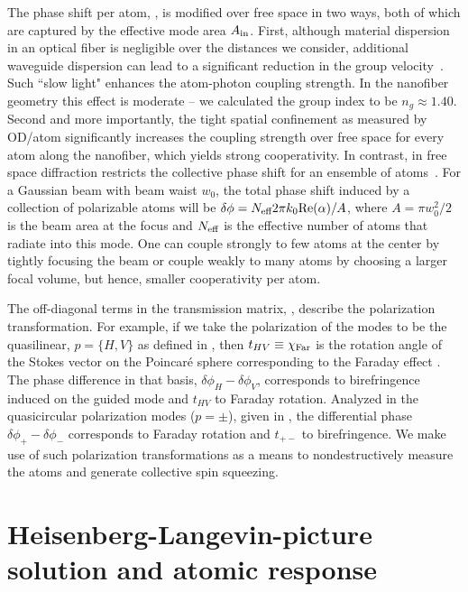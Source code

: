 \documentclass[aps,pra,twocolumn]{revtex4-1} %
\begin{document}
The phase shift per atom, , is modified over free space in two ways, both of which are captured by the effective mode area $A_{\rm in}$. First, although material dispersion in an optical fiber is negligible over the distances we consider, additional waveguide dispersion can lead to a significant reduction in the group velocity~\cite{hung_trapped_2013,goban_atomlight_2014}.  Such ``slow light" enhances the atom-photon coupling strength. 
In the nanofiber geometry this effect is moderate -- we calculated the group index to be $n_g \approx 1.40$. 
Second and more importantly, the tight spatial confinement as measured by OD/atom significantly increases the coupling strength over free space for every atom along the nanofiber, which yields strong cooperativity.
In contrast, in free space diffraction restricts the collective phase shift for an ensemble of atoms~\cite{tanji-suzuki_chapter_2011, baragiola_three-dimensional_2014}.  
For a Gaussian beam with beam waist $w_0$, the total phase shift induced by a collection of polarizable atoms will be $\delta \phi = N_{\text{eff}} 2 \pi k_0 {\rm Re}({\alpha})/A$, where $A = \pi w^2_0/2$ is the beam area at the focus and $N_{\text{eff}}$ is the effective number of atoms that radiate into this mode.  
One can couple strongly to few atoms at the center by tightly focusing the beam or couple weakly to many atoms by choosing a larger focal volume, but hence, smaller cooperativity per atom.  

The off-diagonal terms in the transmission matrix, , describe the polarization transformation. For example, if we take the polarization of the modes to be the quasilinear, $p = \{H,V\}$ as defined in , then $t_{HV} \equiv \chi_{\rm Far}$ is the rotation angle of the Stokes vector on the Poincar\'{e} sphere corresponding to the Faraday effect \cite{hammerer_quantum_2010, deutsch_quantum_2010}.  
The phase difference in that basis, $\delta  \phi_H - \delta \phi_V$, corresponds to birefringence induced on the guided mode and $t_{HV}$ to Faraday rotation.  
Analyzed in the quasicircular polarization modes ($p=\pm$), given in , the differential phase $\delta \phi_+ -\delta  \phi_-$ corresponds to Faraday rotation and $t_{+-}$ to birefringence.  
We make use of such polarization transformations as a means to nondestructively measure the atoms and generate collective spin squeezing.

	
\section{Heisenberg-Langevin-picture solution and atomic response} \label{Sec::HeisenbergLangevin}
	
\end{document}

